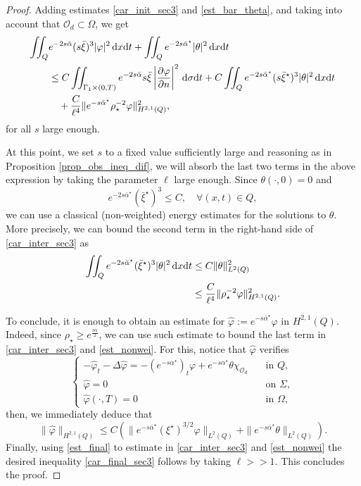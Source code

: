 \documentclass{aims}
\theoremstyle{definition}
\def\dx{\,\textnormal{d}x}
\def\dt{\textnormal{d}t}
\def\d{\,\textnormal{d}}
\begin{document}
\begin{proof}
Adding estimates \eqref{car_init_sec3} and \eqref{est_bar_theta}, and taking into account that $\mathcal O_d\subset\Omega$, we get
%
\begin{align} \notag
\iint_{Q}&e^{-2s\bar\alpha}(s\bar\xi)^3|\varphi|^2\dx\dt+\iint_{Q}e^{-2s\bar\alpha^\star}|\theta|^2\dx\dt \\ \label{car_inter_sec3}
&\leq C\iint_{\Gamma_1\times(0,T)}e^{-2s\bar\alpha}s\bar\xi\left|\frac{\partial \varphi}{\partial n}\right|^2\d\sigma\dt+C\iint_{Q}e^{-2s\bar\alpha^\star}(s\bar\xi^\star)^3|\theta|^2\dx\dt\\
&\quad +\frac{C}{\ell^4}\|e^{-s\bar\alpha^\star}\rho_\star^{-2}\varphi\|^2_{H^{2,1}(Q)},
\end{align}
%
for all $s$ large enough. 

At this point, we set $s$ to a fixed value sufficiently large and reasoning as in Proposition \ref{prop_obs_ineq_dif}, we will absorb the last two terms in the above expression by taking the parameter $\ell$ large enough. Since $\theta(\cdot,0)=0$ and
%
\begin{equation*}
e^{-2s\bar\alpha^\star}({\bar\xi^\star})^3\leq C, \quad \forall (x,t)\in Q,
\end{equation*}
% 
we can use a classical (non-weighted) energy estimates for the solutions to $\theta$. More precisely, we can bound the second term in the right-hand side of \eqref{car_inter_sec3} as
%
\begin{align}\notag
\iint_{Q}e^{-2s\bar\alpha^\star}({\bar\xi^\star})^3|\theta|^2\dx\dt&\leq C\|\theta\|^2_{L^2(Q)}  \\ \label{est_nonwei}
&\leq \frac{C}{\ell^4}\|\rho_\star^{-2}\varphi\|^2_{H^{2,1}(Q)}. 
\end{align}
%

To conclude, it is enough to obtain an estimate for $\widehat{\varphi}:=e^{-s\bar\alpha^\star}\varphi$ in $H^{2,1}(Q)$. Indeed, since $\rho_\star\geq e^{\frac{s\alpha}{2}}$, we can use such estimate to bound the last term in \eqref{car_inter_sec3} and \eqref{est_nonwei}. For this, notice that $\widehat{\varphi}$ verifies
%
\begin{equation*}%
\begin{cases}
-\widehat\varphi_t-\Delta \widehat\varphi=-(e^{-s\alpha^\star})_t\varphi+e^{-s\alpha^\star}\theta\chi_{\mathcal O_d} &\quad \text{in } Q, \\
\widehat\varphi=0 &\quad \text{on } \Sigma, \\
\widehat{\varphi}(\cdot,T)=0 &\quad\text{in } \Omega,
\end{cases}
\end{equation*}
%
then, we immediately deduce that
%
\begin{equation}\label{est_final}
\|\widehat{\varphi}\|_{H^{2,1}(Q)}\leq C\left(\|e^{-s\bar\alpha^\star}(\xi^\star)^{3/2}\varphi\|_{L^2(Q)}+\|e^{-s\bar\alpha^\star}\theta\|_{L^2(Q)}\right).
\end{equation}
%
Finally, using \eqref{est_final} to estimate in \eqref{car_inter_sec3} and \eqref{est_nonwei} the desired inequality \eqref{car_final_sec3} follows by taking $\ell>>1$. This concludes the proof.
%
\end{proof}
\end{document}
